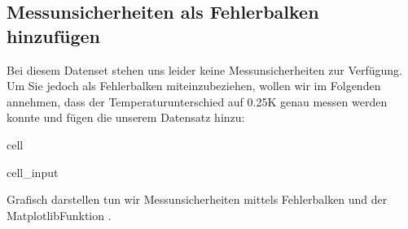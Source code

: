 \documentclass[letterpaper,10pt,english]{jupyterBook}
\begin{document}
\subsection{Messunsicherheiten als Fehlerbalken hinzufügen}
\label{\detokenize{content/1_APy_Plotten:messunsicherheiten-als-fehlerbalken-hinzufugen}}
\sphinxAtStartPar
Bei diesem Datenset stehen uns leider keine Messunsicherheiten zur Verfügung. Um Sie jedoch als Fehlerbalken miteinzubeziehen, wollen wir im Folgenden annehmen, dass der Temperaturunterschied auf 0.25K genau messen werden konnte und fügen die unserem Datensatz hinzu:

\begin{sphinxuseclass}{cell}\begin{sphinxVerbatimInput}

\begin{sphinxuseclass}{cell_input}
\begin{sphinxVerbatim}[commandchars=\\\{\}]
\PYG{p}{[}\PYG{p}{]}  
\end{sphinxVerbatim}

\end{sphinxuseclass}\end{sphinxVerbatimInput}

\end{sphinxuseclass}
\sphinxAtStartPar
Grafisch darstellen tun wir Messunsicherheiten mittels Fehlerbalken und der Matplotlib\sphinxhyphen{}Funktion .
\end{document}
